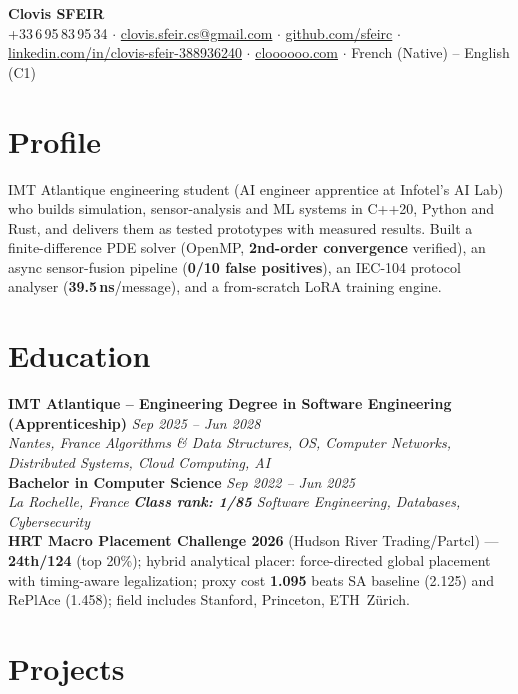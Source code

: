 \documentclass[10pt]{article}
\newcommand{\entry}[4]{%
  \noindent\textbf{#1} \hfill \textit{#2} \\
  \textit{#3} \hfill \textit{#4}\\[-0.22em]
}
\begin{document}
\fontsize{9.3pt}{11pt}\selectfont
\begin{center}
  {\LARGE \textbf{Clovis SFEIR}}\\[0.3em]
  +33\,6\,95\,83\,95\,34 \;$\cdot$\; \href{mailto:clovis.sfeir.cs@gmail.com}{clovis.sfeir.cs@gmail.com} \;$\cdot$\;
  \href{https://github.com/sfeirc}{github.com/sfeirc} \;$\cdot$\;
  \href{https://linkedin.com/in/clovis-sfeir-388936240}{linkedin.com/in/clovis-sfeir-388936240} \;$\cdot$\;
  \href{https://cloooooo.com}{cloooooo.com} \;$\cdot$\; French (Native) -- English (C1)
\end{center}

\section*{Profile}
IMT Atlantique engineering student (AI engineer apprentice at Infotel's AI Lab) who builds simulation, sensor-analysis and ML systems in C++20, Python and Rust, and delivers them as tested prototypes with measured results. Built a finite-difference PDE solver (OpenMP, \textbf{2nd-order convergence} verified), an async sensor-fusion pipeline (\textbf{0/10 false positives}), an IEC-104 protocol analyser (\textbf{39.5\,ns}/message), and a from-scratch LoRA training engine.

\section*{Education}
\entry{IMT Atlantique -- Engineering Degree in Software Engineering (Apprenticeship)}{Sep 2025 -- Jun 2028}{Nantes, France}{Algorithms \& Data Structures, OS, Computer Networks, Distributed Systems, Cloud Computing, AI}
\entry{Bachelor in Computer Science}{Sep 2022 -- Jun 2025}{La Rochelle, France}{\textbf{Class rank: 1/85} \textbar{} Software Engineering, Databases, Cybersecurity}
\noindent\textbf{HRT Macro Placement Challenge 2026} (Hudson River Trading/Partcl) --- \textbf{24th/124} (top 20\%); hybrid analytical placer: force-directed global placement with timing-aware legalization; proxy cost \textbf{1.095} beats SA baseline (2.125) and RePlAce (1.458); field includes Stanford, Princeton, ETH~Z\"urich.

\section*{Projects}
\end{document}
